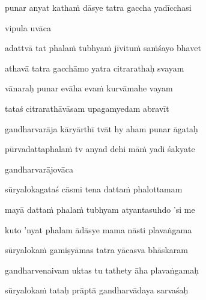 punar anyat kathaṁ dāsye tatra gaccha yadīcchasi \veg\dontdisplaylinenum
{}

vipula uvāca~{\dandab}\dontdisplaylinenum 

adattvā tat phalaṁ tubhyaṁ jīvituṁ saṁśayo bhavet\thinspace{\danda} \dontdisplaylinenum

athavā tatra gacchāmo yatra citrarathaḥ svayam \veg\dontdisplaylinenum
{}

vānaraḥ punar evāha evaṁ kurvāmahe vayam\thinspace{\dandab} \dontdisplaylinenum

tataś citrarathāvāsam upagamyedam abravīt \veg\dontdisplaylinenum
{}

gandharvarāja kāryārthī tvāt hy aham punar āgataḥ\thinspace{\dandab} \dontdisplaylinenum

pūrvadattaphalaṁ tv anyad dehi māṁ yadi śakyate \veg\dontdisplaylinenum 
{}

gandharvarājovāca~{\dandab}\dontdisplaylinenum 
{}

sūryalokagataś cāsmi tena dattaṁ phalottamam\thinspace{\danda} \dontdisplaylinenum

mayā dattaṁ phalaṁ tubhyam atyantasuhdo 'si me \veg\dontdisplaylinenum
{}

kuto 'nyat phalam ādāsye mama nāsti plavaṅgama\thinspace{\dandab} \dontdisplaylinenum

sūryalokaṁ gamiṣyāmas tatra yācasva bhāskaram \veg\dontdisplaylinenum
{}

gandharvenaivam uktas tu tathety āha plavaṅgamaḥ\thinspace{\dandab} \dontdisplaylinenum

sūryalokaṁ tataḥ prāptā gandharvādaya sarvaśaḥ \veg\dontdisplaylinenum
{}

